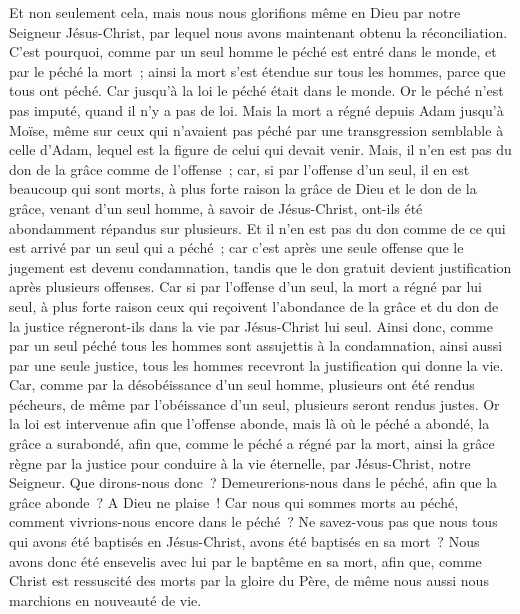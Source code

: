 \begin{multicols}{2}
Et non seulement cela, mais nous nous glorifions même en Dieu par notre Seigneur Jésus-Christ, par lequel nous avons maintenant obtenu la réconciliation.
C'est pourquoi, comme par un seul homme le péché est entré dans le monde, et par le péché la mort~; ainsi la mort s'est étendue sur tous les hommes, parce que tous ont péché.
Car jusqu'à la loi le péché était dans le monde. Or le péché n'est pas imputé, quand il n'y a pas de loi.
Mais la mort a régné depuis Adam jusqu'à Moïse, même sur ceux qui n'avaient pas péché par une transgression semblable à celle d'Adam, lequel est la figure de celui qui devait venir.
Mais, il n'en est pas du don de la grâce comme de l'offense~; car, si par l'offense d'un seul, il en est beaucoup qui sont morts, à plus forte raison la grâce de Dieu et le don de la grâce, venant d'un seul homme, à savoir de Jésus-Christ, ont-ils été abondamment répandus sur plusieurs.
Et il n'en est pas du don comme de ce qui est arrivé par un seul qui a péché~; car c'est après une seule offense que le jugement est devenu condamnation, tandis que le don gratuit devient justification après plusieurs offenses.
Car si par l'offense d'un seul, la mort a régné par lui seul, à plus forte raison ceux qui reçoivent l'abondance de la grâce et du don de la justice régneront-ils dans la vie par Jésus-Christ lui seul.
Ainsi donc, comme par un seul péché tous les hommes sont assujettis à la condamnation, ainsi aussi par une seule justice, tous les hommes recevront la justification qui donne la vie.
Car, comme par la désobéissance d'un seul homme, plusieurs ont été rendus pécheurs, de même par l'obéissance d'un seul, plusieurs seront rendus justes.
Or la loi est intervenue afin que l'offense abonde, mais là où le péché a abondé, la grâce a surabondé,
afin que, comme le péché a régné par la mort, ainsi la grâce règne par la justice pour conduire à la vie éternelle, par Jésus-Christ, notre Seigneur.
\VerseOne{}Que dirons-nous donc~? Demeurerions-nous dans le péché, afin que la grâce abonde~?
A Dieu ne plaise~! Car nous qui sommes morts au péché, comment vivrions-nous encore dans le péché~?
Ne savez-vous pas que nous tous qui avons été baptisés en Jésus-Christ, avons été baptisés en sa mort~?
Nous avons donc été ensevelis avec lui par le baptême en sa mort, afin que, comme Christ est ressuscité des morts par la gloire du Père, de même nous aussi nous marchions en nouveauté de vie.

\end{multicols}
